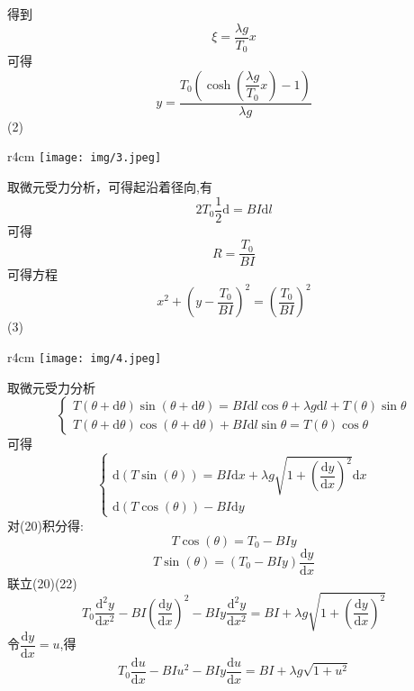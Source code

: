 \documentclass{article}
\begin{document}
得到
\[
\xi=\dfrac{\lambda g}{T_{0}} x
\tag{14}
\]
可得
\[
y=\dfrac{T_0\left(\cosh\left(\dfrac{\lambda g}{T_{0}} x\right)-1\right)}{\lambda g}
\tag{15}
\]
(2)
\par
\begin{wrapfigure}{r}{4cm}
	\vspace{-15pt}    %
	\texttt{[image: img/3.jpeg]}\\
	\vspace{-15pt}    %
	\caption{}
	\vspace{-15pt}    %
\end{wrapfigure}
取微元受力分析，可得起沿着径向,有
\[
2T_0\frac{1}{2}\mathrm{d}=BI\mathrm{d}l
\tag{16}
\]
可得
\[
R=\dfrac{T_0}{BI}
\tag{17}
\]
可得方程
\[
x^2+\left(y-\dfrac{T_0}{BI}\right)^2=\left(\dfrac{T_0}{BI}\right)^2
\tag{18}
\]
(3)
\par
\begin{wrapfigure}{r}{4cm}
	\vspace{-15pt}    %
	\texttt{[image: img/4.jpeg]}\\
	\vspace{-15pt}    %
	\caption{}
	\vspace{-15pt}    %
\end{wrapfigure}
取微元受力分析
\[
\begin{cases}
    T\left( \theta +\mathrm{d}\theta \right) \sin \left( \theta +\mathrm{d}\theta \right) =BI\mathrm{d}l\cos \theta +\lambda g\mathrm{d}l+T(\theta)\sin \theta \\
    T\left( \theta +\mathrm{d}\theta \right) \cos \left( \theta +\mathrm{d}\theta \right) +BI\mathrm{d}l\sin \theta =T(\theta)\cos \theta 
\end{cases}
\tag{19}
\]
可得
\[
\begin{cases}
\mathrm{d}(T\sin(\theta))=BI\mathrm{d}x+\lambda g \sqrt{1+\left(\dfrac{\mathrm{d}y}{\mathrm{d}x}\right)^2}\mathrm{d}x\\
\mathrm{d}(T\cos(\theta))-BI\mathrm{d}y
\end{cases}
\tag{20}
\]
对(20)积分得:
\[
T\cos(\theta)=T_0-BIy
\tag{21}
\]
\[
T\sin(\theta)=(T_0-BIy)\dfrac{\mathrm{d}y}{\mathrm{d}x} 
\tag{22}
\]
联立(20)(22)
\[
T_{0}\dfrac{\mathrm{d}^{2}y}{\mathrm{d}x^{2}}-BI\left( \dfrac{\mathrm{d}y}{\mathrm{d}x}\right) ^{2}-BIy\dfrac{\mathrm{d}^{2}y}{\mathrm{d}x^{2}}=BI+\lambda g\sqrt{1+\left(\dfrac{\mathrm{d}y}{\mathrm{d}x}\right)^2}
\tag{23}
\]
令$\dfrac{\mathrm{d}y}{\mathrm{d}x}=u$,得
\[
T_{0}\dfrac{\mathrm{d}u}{\mathrm{d}x}-BIu^{2}-BIy\dfrac{\mathrm{d}u}{\mathrm{d}x}=BI+\lambda g\sqrt{1+u^{2}}
\tag{24}
\]
\end{document}
